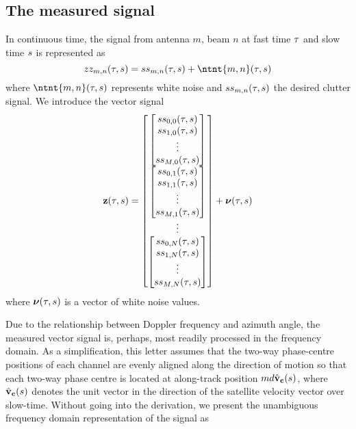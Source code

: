 \documentclass[journal]{IEEEtran}
\newcommand{\phaseSep}{\ensuremath{d}}
\newcommand{\vecsigTime}{\ensuremath{\vct{z}}}
\begin{document}
\subsection{The measured signal}
In continuous time, the signal from antenna $m$, beam $n$ at fast time $\tau$ and slow time $s$ is represented as
\begin{equation}
 \ztzt{m,n}(\fasttime, \parm)=\stst{m,n}(\fasttime, \parm) + \ntnt{m,n}(\fasttime, \parm)
\end{equation}
where $\ntnt{m,n}(\fasttime, \parm)$ represents white noise and $ss_{m,n}(\tau, s)$ the desired clutter signal. We introduce the vector signal
\begin{equation}
 \vecsigTime(\fasttime, \parm) = 
 \begin{bmatrix}
 \begin{bmatrix}
 \stst{0,0}(\fasttime, \parm)\\
 \stst{1,0}(\fasttime, \parm)\\
 \vdots\\
 \stst{M,0}(\fasttime, \parm)
 \end{bmatrix}\\
 \begin{bmatrix}
 \stst{0,1}(\fasttime, \parm)\\
 \stst{1,1}(\fasttime, \parm)\\
 \vdots\\
 \stst{M,1}(\fasttime, \parm)
 \end{bmatrix}\\
 \vdots\\
 \begin{bmatrix}
 \stst{0,N}(\fasttime, \parm)\\
 \stst{1,N}(\fasttime, \parm)\\
 \vdots\\
 \stst{M, N}(\fasttime, \parm)
 \end{bmatrix}
 \end{bmatrix}
 +
 \boldsymbol{\nu}(\fasttime, \parm)
\end{equation}
where $\boldsymbol{\nu}(\tau, s)$ is a vector of white noise values.
\par
Due to the relationship between Doppler frequency and azimuth angle, the measured vector signal is, perhaps, most readily processed in the frequency domain. As a simplification, this letter assumes that the two-way phase-centre positions of each channel are evenly aligned along the direction of motion so that each two-way phase centre is located at along-track position $m\phaseSep\uSatVelocity{\parm}$, where $\hat{\mathbf{v}}_{\mathbf{c}}(s)$ denotes the unit vector in the direction of the satellite velocity vector over slow-time. Without going into the derivation, we present the unambiguous frequency domain representation of the signal as
\end{document}
